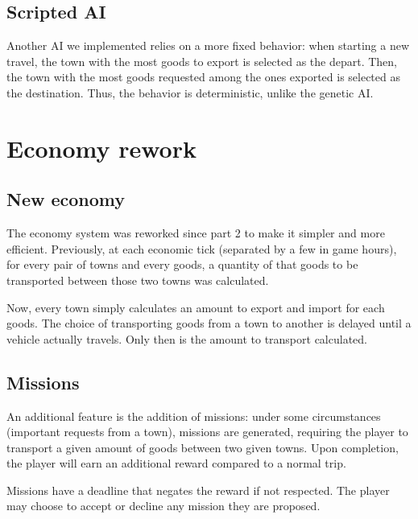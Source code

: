 \documentclass{article}
\begin{document}
\subsection{Scripted AI}
Another AI we implemented relies on a more fixed behavior:
when starting a new travel, the town with the most goods to export is selected
as the depart. Then, the town with the most goods requested among the ones exported
is selected as the destination. Thus, the behavior is deterministic, unlike the
genetic AI.


\section{Economy rework}
\subsection{New economy}
The economy system was reworked since part 2 to make it simpler and more efficient.
Previously, at each economic tick (separated by a few in game hours), for every
pair of towns and every goods, a quantity of that goods to be transported
between those two towns was calculated.

Now, every town simply calculates an amount to export and import for each goods.
The choice of transporting goods from a town to another is delayed until a
vehicle actually travels. Only then is the amount to transport calculated.

\subsection{Missions}
An additional feature is the addition of missions: under some circumstances
(important requests from a town), missions are generated, requiring the player
to transport a given amount of goods between two given towns. Upon completion,
the player will earn an additional reward compared to a normal trip.

Missions have a deadline that negates the reward if not respected. The player
may choose to accept or decline any mission they are proposed.
\end{document}
